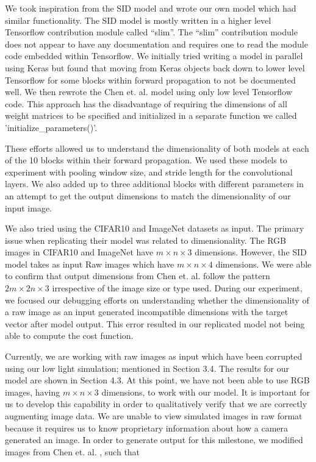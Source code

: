 \documentclass{article}
\begin{document}
We took inspiration from the SID model and wrote our own model which
had similar functionality. The SID model is mostly written in a higher
level Tensorflow contribution module called ``slim''. The ``slim''
contribution module does not appear to have any documentation and requires
one to read the module code embedded within Tensorflow. We initially tried
writing a model in parallel using Keras but found that moving from Keras
objects back down to lower level Tensorflow for some blocks within
forward propagation to not be documented well. We then rewrote the
Chen et. al. \cite{chen2018learning} model using only low level Tensorflow
code. This approach has the disadvantage of requiring the dimensions of
all weight matrices to be specified and initialized in a separate function
we called 'initialize\_parameters()'. \newline

These efforts allowed us to understand the dimensionality of both models at
each of the 10 blocks within their forward propagation. We used these
models to experiment with pooling window size, and stride
length for the convolutional layers. We also added up
to three additional blocks with different parameters in an attempt to
get the output dimensions to match the dimensionality of our input
image. \newline

We also tried using the CIFAR10 and ImageNet datasets as input. The primary
issue when replicating their model was related to dimensionality. The RGB
images in CIFAR10 and ImageNet have $m \times n \times 3$ dimensions.
However, the SID model takes as input Raw images which have
$m \times n \times 4$ dimensions. We were able to confirm that output
dimensions from Chen et. al. \cite{chen2018learning} follow the pattern
$2m \times 2n \times 3$ irrespective of the image size or type used. During
our experiment, we focused our debugging efforts on understanding whether
the dimensionality of a raw image as an input generated incompatible
dimensions with the target vector after model output. This error resulted
in our replicated model not being able to compute the cost function.\newline

Currently, we are working with raw images as input which have been corrupted
using our low light simulation; mentioned in Section 3.4. The results
for our model are shown in Section 4.3. At this point, we have not been
able to use RGB images, having $m \times n \times 3$ dimensions, to work
with our model. It is important for us to develop this
capability in order to qualitatively verify that we are correctly augmenting
image data. We are unable to view simulated images in raw format because
it requires us to know proprietary information about how a camera
generated an image. In order to generate output for this milestone, we
modified images from Chen et. al. \cite{chen2018learning}, such that
\end{document}
